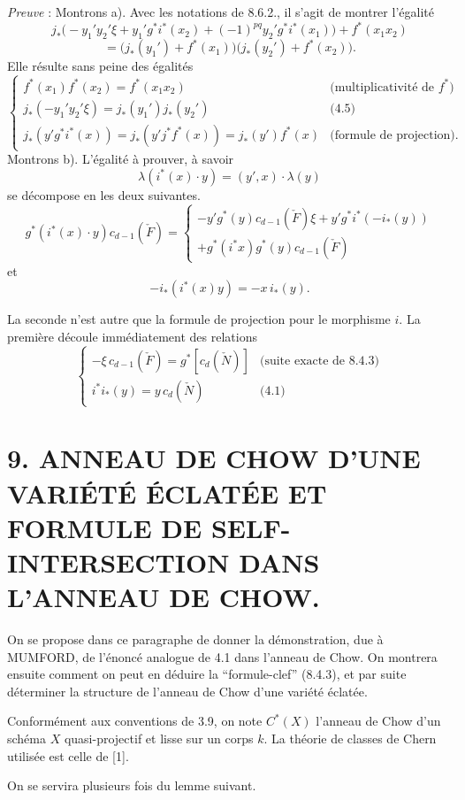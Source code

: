 \emph{Preuve} : Montrons a). Avec les notations de 8.6.2., il s'agit de montrer l'égalité
\[
j_*\bigl(-y_1'y_2'\xi+y_1'g^*i^*(x_2)+(-1)^{pq}y_2'g^*i^*(x_1)\bigr)+f^*(x_1x_2)
\]
\[
=\bigl(j_*(y_1')+f^*(x_1)\bigr)\bigl(j_*(y_2')+f^*(x_2)\bigr).
\]
Elle résulte sans peine des égalités
\[
\begin{cases}
f^*(x_1)f^*(x_2)=f^*(x_1x_2)&\text{(multiplicativité de }f^*\text{)}\\
j_*(-y_1'y_2'\xi)=j_*(y_1')j_*(y_2')&\text{(4.5)}\\
j_*(y'g^*i^*(x))=j_*(y'j^*f^*(x))=j_*(y')f^*(x)&\text{(formule de projection)}.
\end{cases}
\]
Montrons b). L'égalité à prouver, à savoir
\[
\lambda(i^*(x)\cdot y)=(y',x)\cdot\lambda(y)
\]
se décompose en les deux suivantes.
\[
g^*(i^*(x)\cdot y)c_{d-1}(\check F)
=
\begin{cases}
-y'g^*(y)c_{d-1}(\check F)\xi+y'g^*i^*(-i_*(y))\\
+g^*(i^*x)g^*(y)c_{d-1}(\check F)
\end{cases}
\]
et
\[
-i_*(i^*(x)y)=-x\,i_*(y).
\]

La seconde n'est autre que la formule de projection pour le morphisme $i$. La première découle immédiatement des relations
\[
\begin{cases}
-\xi\,c_{d-1}(\check F)=g^*[c_d(\check N)]&\text{(suite exacte de 8.4.3)}\\
i^*i_*(y)=y\,c_d(\check N)&\text{(4.1)}
\end{cases}
\]

\section*{9. ANNEAU DE CHOW D'UNE VARIÉTÉ ÉCLATÉE ET FORMULE DE SELF-INTERSECTION DANS L'ANNEAU DE CHOW.}

On se propose dans ce paragraphe de donner la démonstration, due à MUMFORD, de l'énoncé analogue de 4.1 dans l'anneau de Chow. On montrera ensuite comment on peut en déduire la ``formule-clef'' (8.4.3), et par suite déterminer la structure de l'anneau de Chow d'une variété éclatée.

Conformément aux conventions de 3.9, on note $C^*(X)$ l'anneau de Chow d'un schéma $X$ quasi-projectif et lisse sur un corps $k$. La théorie de classes de Chern utilisée est celle de [1].

On se servira plusieurs fois du lemme suivant.

